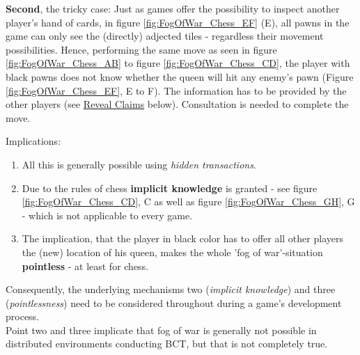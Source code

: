 \noindent \textbf{Second}, the tricky case:
Just as games offer the possibility to inspect another player's hand of cards, in figure \ref{fig:FogOfWar_Chess_EF} (E),
all pawns in the game can only see the (directly) adjected tiles - regardless their movement possibilities.
Hence, performing the same move as seen in figure \ref{fig:FogOfWar_Chess_AB} to figure \ref{fig:FogOfWar_Chess_CD},
the player with black pawns does not know whether the queen will hit any enemy's pawn (Figure \ref{fig:FogOfWar_Chess_EF}, E to F).
The information has to be provided by the other players (see \hyperref[sec:RcTeDisputes]{Reveal Claims} below).
Consultation is needed to complete the move.
\begin{figure}
\end{figure}
\noindent Implications:
\begin{enumerate}
	\item All this is generally possible using \textit{hidden transactions}.
	\item Due to the rules of chess \textbf{implicit knowledge} is granted - see figure \ref{fig:FogOfWar_Chess_CD}, C as well as figure \ref{fig:FogOfWar_Chess_GH}, G -
	which is not applicable to every game.
	\item The implication, that the player in black color has to offer all other players the (new) location of his queen, makes the whole 'fog of war'-situation \textbf{pointless} - at least for chess.
\end{enumerate}
\noindent Consequently, the underlying mechanisms two (\textit{implicit knowledge}) and three (\textit{pointlessness}) need to be considered throughout during a game's development process. \\
Point two and three implicate that fog of war is generally not possible in distributed environments conducting \gls{BCT}, but that is not completely true.
